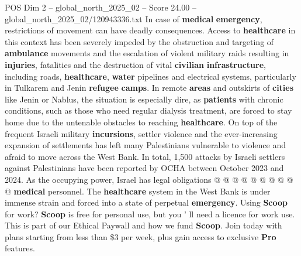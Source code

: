 \begin{textsample}{POS Dim 2 – global\_north\_2025\_02 – Score 24.00 – global\_north\_2025\_02/120943336.txt}
In case of \textbf{medical} \textbf{emergency}, restrictions of movement can have deadly consequences.
Access to \textbf{healthcare} in this context has been severely impeded by the obstruction and targeting of \textbf{ambulance} movements and the escalation of violent military raids resulting in \textbf{injuries}, fatalities and the destruction of vital \textbf{civilian} \textbf{infrastructure}, including roads, \textbf{healthcare}, \textbf{water} pipelines and electrical systems, particularly in Tulkarem and Jenin \textbf{refugee} \textbf{camps}.
In remote \textbf{areas} and outskirts of \textbf{cities} like Jenin or Nablus, the situation is especially dire, as \textbf{patients} with chronic conditions, such as those who need regular dialysis treatment, are forced to stay home due to the untenable obstacles to reaching \textbf{healthcare}.
On top of the frequent Israeli military \textbf{incursions}, settler violence and the ever-increasing expansion of settlements has left many Palestinians vulnerable to violence and afraid to move across the West Bank.
In total, 1,500 attacks by Israeli settlers against Palestinians have been reported by OCHA between October 2023 and 2024.
As the occupying power, Israel has legal obligations @ @ @ @ @ @ @ @ @ @ \textbf{medical} personnel.
The \textbf{healthcare} system in the West Bank is under immense strain and forced into a state of perpetual \textbf{emergency}.
Using \textbf{Scoop} for work? \textbf{Scoop} is free for personal use, but you ' ll need a licence for work use.
This is part of our Ethical Paywall and how we fund \textbf{Scoop}.
Join today with plans starting from less than \$3 per week, plus gain access to exclusive \textbf{Pro} features.

\end{textsample}
